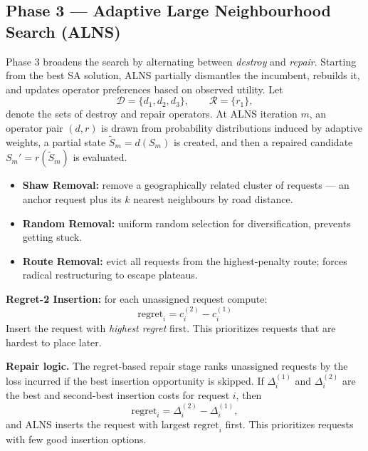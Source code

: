\documentclass[11pt,a4paper]{article}
\begin{document}
\subsection{Phase 3 --- Adaptive Large Neighbourhood Search (ALNS)}

Phase 3 broadens the search by alternating between \emph{destroy} and \emph{repair}. Starting from the best SA solution, ALNS partially dismantles the incumbent, rebuilds it, and updates operator preferences based on observed utility. Let
\[
\mathcal D=\{d_1,d_2,d_3\}, \qquad \mathcal R=\{r_1\},
\]
denote the sets of destroy and repair operators. At ALNS iteration $m$, an operator pair $(d,r)$ is drawn from probability distributions induced by adaptive weights, a partial state $\widetilde S_m=d(S_m)$ is created, and then a repaired candidate $S_m'=r(\widetilde S_m)$ is evaluated.

\vspace{4pt}
\begin{tcolorbox}[colback=velred!5, colframe=velred!50, title=Destroy Operators, fonttitle=\small\bfseries, boxrule=0.5pt, arc=2pt, top=4pt, bottom=4pt, left=6pt, right=6pt]
\small
\begin{itemize}[leftmargin=12pt,itemsep=2pt]
  \item \textbf{Shaw Removal:} remove a geographically related cluster of requests --- an anchor request plus its $k$ nearest neighbours by road distance.
  \item \textbf{Random Removal:} uniform random selection for diversification, prevents getting stuck.
  \item \textbf{Route Removal:} evict all requests from the highest-penalty route; forces radical restructuring to escape plateaus.
\end{itemize}
\end{tcolorbox}

\vspace{4pt}
\begin{tcolorbox}[colback=velgreen!5, colframe=velgreen!50, title=Repair Operator, fonttitle=\small\bfseries, boxrule=0.5pt, arc=2pt, top=4pt, bottom=4pt, left=6pt, right=6pt]
\small
\textbf{Regret-2 Insertion:} for each unassigned request compute:
\[
\mathrm{regret}_i = c_i^{(2)} - c_i^{(1)}
\]
Insert the request with \textit{highest regret} first. This prioritizes requests that are hardest to place later.
\end{tcolorbox}

\vspace{6pt}
\noindent\textbf{Repair logic.} The regret-based repair stage ranks unassigned requests by the loss incurred if the best insertion opportunity is skipped. If $\Delta_i^{(1)}$ and $\Delta_i^{(2)}$ are the best and second-best insertion costs for request $i$, then
\[
\mathrm{regret}_i = \Delta_i^{(2)} - \Delta_i^{(1)},
\]
and ALNS inserts the request with largest $\mathrm{regret}_i$ first. This prioritizes requests with few good insertion options.
\end{document}
